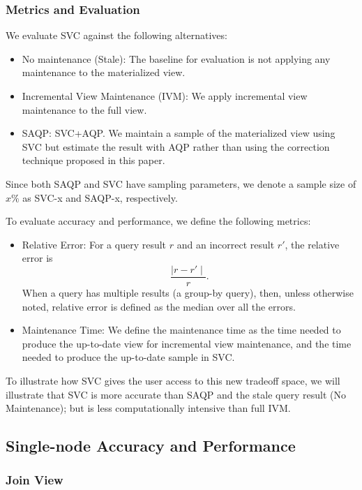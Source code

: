 \subsubsection{Metrics and Evaluation}
We evaluate SVC against the following alternatives:
\begin{itemize}
\item No maintenance (Stale): The baseline for evaluation is not applying any maintenance to the materialized view.
\item Incremental View Maintenance (IVM): We apply incremental view maintenance to the full view.
\item SAQP: SVC+AQP. We maintain a sample of the materialized view using SVC but estimate the result with AQP rather than using 
the correction technique proposed in this paper.
\end{itemize}
Since both SAQP and SVC have sampling parameters, we denote a sample size of $x \% $ as SVC-x and SAQP-x, respectively. 

To evaluate accuracy and performance, we define the following metrics:
\begin{itemize}
\item Relative Error: For a query result $r$ and an incorrect result $r'$, the relative error is \[\frac{\mid r-r' \mid}{r}.\] 
When a query has multiple results (a group-by query), then, unless otherwise noted, relative error is defined as the median over all the errors.
\item Maintenance Time: We define the maintenance time as the time needed to produce the up-to-date view for incremental view maintenance, and the time needed to produce the up-to-date sample in SVC. 
\end{itemize}

To illustrate how SVC gives the user access to this new tradeoff space, we will illustrate that SVC is more accurate than SAQP and the stale query result (No Maintenance); but is less computationally intensive than full IVM. 

\subsection{Single-node Accuracy and Performance}

\subsubsection{Join View}

